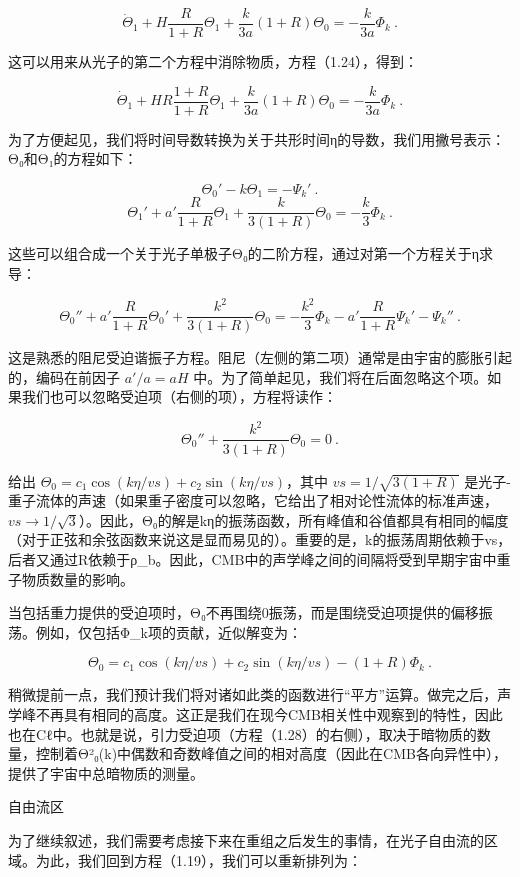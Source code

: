 \[ \dot{\Theta}_1 + H \frac{R}{1 + R} \Theta_1 + \frac{k}{3a} (1 + R) \Theta_0 = -\frac{k}{3a} \Phi_k~. \]

这可以用来从光子的第二个方程中消除物质，方程（1.24），得到：

\[ \dot{\Theta}_1 + H R \frac{1 + R}{1 + R} \Theta_1 + \frac{k}{3a} (1 + R) \Theta_0 = -\frac{k}{3a} \Phi_k ~.\]

为了方便起见，我们将时间导数转换为关于共形时间η的导数，我们用撇号表示：Θ₀和Θ₁的方程如下：

\[ \Theta_0' - k \Theta_1 = -\Psi_k'~. \]
\[ \Theta_1' + a' \frac{R}{1 + R} \Theta_1 + \frac{k}{3(1 + R)} \Theta_0 = -\frac{k}{3} \Phi_k~. \]

这些可以组合成一个关于光子单极子Θ₀的二阶方程，通过对第一个方程关于η求导：

\[ \Theta_0'' + a' \frac{R}{1 + R} \Theta_0' + \frac{k^2}{3(1 + R)} \Theta_0 = -\frac{k^2}{3} \Phi_k - a' \frac{R}{1 + R} \Psi_k' - \Psi_k''~. \]

这是熟悉的阻尼受迫谐振子方程。阻尼（左侧的第二项）通常是由宇宙的膨胀引起的，编码在前因子 \( a'/a = aH \) 中。为了简单起见，我们将在后面忽略这个项。如果我们也可以忽略受迫项（右侧的项），方程将读作：

\[ \Theta_0'' + \frac{k^2}{3(1 + R)} \Theta_0 = 0~. \]

给出 \( \Theta_0 = c_1 \cos(k\eta/vs) + c_2 \sin(k\eta/vs) \)，其中 \( vs = 1/\sqrt{3(1 + R)} \) 是光子-重子流体的声速（如果重子密度可以忽略，它给出了相对论性流体的标准声速，\( vs \rightarrow 1/\sqrt{3} \)）。因此，Θ₀的解是kη的振荡函数，所有峰值和谷值都具有相同的幅度（对于正弦和余弦函数来说这是显而易见的）。重要的是，k的振荡周期依赖于vs，后者又通过R依赖于ρ_b。因此，CMB中的声学峰之间的间隔将受到早期宇宙中重子物质数量的影响。

当包括重力提供的受迫项时，Θ₀不再围绕0振荡，而是围绕受迫项提供的偏移振荡。例如，仅包括Φ_k项的贡献，近似解变为：

\[ \Theta_0 = c_1 \cos(k\eta/vs) + c_2 \sin(k\eta/vs) - (1 + R) \Phi_k~. \]

稍微提前一点，我们预计我们将对诸如此类的函数进行“平方”运算。做完之后，声学峰不再具有相同的高度。这正是我们在现今CMB相关性中观察到的特性，因此也在Cℓ中。也就是说，引力受迫项（方程（1.28）的右侧），取决于暗物质的数量，控制着Θ²₀(k)中偶数和奇数峰值之间的相对高度（因此在CMB各向异性中），提供了宇宙中总暗物质的测量。

自由流区

为了继续叙述，我们需要考虑接下来在重组之后发生的事情，在光子自由流的区域。为此，我们回到方程（1.19），我们可以重新排列为：


